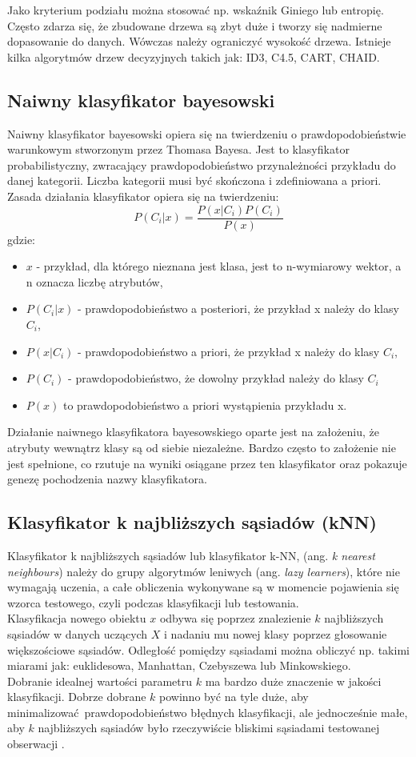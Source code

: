 Jako kryterium podziału można stosować np. wskaźnik Giniego lub entropię. Często zdarza się, że zbudowane drzewa są zbyt duże i tworzy się nadmierne dopasowanie do danych. Wówczas należy ograniczyć wysokość drzewa.
Istnieje kilka algorytmów drzew decyzyjnych takich jak: ID3, C4.5, CART, CHAID. 
\subsection{Naiwny klasyfikator bayesowski}
Naiwny klasyfikator bayesowski opiera się na twierdzeniu o prawdopodobieństwie warunkowym stworzonym przez Thomasa Bayesa. Jest to klasyfikator probabilistyczny, zwracający prawdopodobieństwo przynależności przykładu do danej kategorii. Liczba kategorii musi być skończona i zdefiniowana a priori. Zasada działania klasyfikator opiera się na twierdzeniu:
\[P(C_i|x) = \frac{P(x|C_i)P(C_i)}{P(x)}\]
gdzie:
\begin{itemize}
	\item $x$ - przykład, dla którego nieznana jest klasa, jest to n-wymiarowy wektor, a n oznacza liczbę atrybutów,  
	\item $P(C_i|x)$ - prawdopodobieństwo a posteriori, że przykład x należy do klasy $C_i$,
	\item $P(x|C_i)$ - prawdopodobieństwo a priori, że przykład x należy do klasy $C_i$,
	\item $P(C_i)$ - prawdopodobieństwo, że dowolny przykład należy do klasy $C_i$
	\item $P(x)$ to prawdopodobieństwo a priori wystąpienia przykładu x.
\end{itemize}
Działanie naiwnego klasyfikatora bayesowskiego oparte jest na założeniu, że atrybuty wewnątrz klasy są od siebie niezależne. Bardzo często to założenie nie jest spełnione, co rzutuje na wyniki osiągane przez ten klasyfikator oraz pokazuje genezę pochodzenia nazwy klasyfikatora.
\subsection{Klasyfikator k najbliższych sąsiadów (kNN)}
Klasyfikator k najbliższych sąsiadów lub klasyfikator k-NN, (ang. \textit{k nearest neighbours}) należy do grupy algorytmów leniwych (ang. \textit{lazy learners}), które nie wymagają uczenia, a całe obliczenia wykonywane są w momencie pojawienia się wzorca testowego, czyli podczas klasyfikacji lub testowania. \\
Klasyfikacja nowego obiektu $x$ odbywa się poprzez znalezienie $k$ najbliższych sąsiadów w danych uczących $X$ i nadaniu mu nowej klasy poprzez głosowanie większościowe sąsiadów. Odległość pomiędzy sąsiadami można obliczyć np. takimi miarami jak: euklidesowa, Manhattan, Czebyszewa lub Minkowskiego. \\
Dobranie idealnej wartości parametru $k$ ma bardzo duże znaczenie w jakości klasyfikacji. Dobrze dobrane $k$ powinno być na tyle duże, aby minimalizować prawdopodobieństwo błędnych klasyfikacji, ale jednocześnie małe, aby $k$ najbliższych sąsiadów było rzeczywiście bliskimi sąsiadami testowanej obserwacji \cite{Bishop}. 
